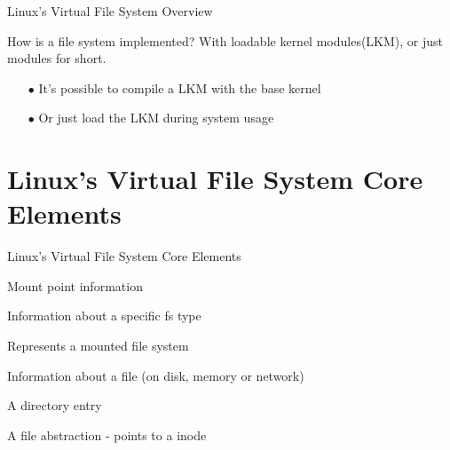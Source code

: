 \documentclass{beamer}
\begin{document}
\begin{frame}{Linux's Virtual File System Overview}

	\begin{block}{How is a file system implemented?}
		With loadable kernel modules\footnotemark[1] (LKM), or just modules for short.
	\end{block}

	\vspace{15pt}

	\begin{itemize}
	
		\item[$\bullet$]{It's possible to compile a LKM with the base kernel}
		\item[$\bullet$]{Or just load the LKM during system usage}

	\end{itemize}


\end{frame}

\section{Linux's Virtual File System Core Elements}

\begin{frame}{Linux's Virtual File System Core Elements}

	\begin{description}\itemsep4pt
			
		\item[vfsmount]{Mount point information}
		\item[file\_system\_type]{Information about a specific fs type}
		\item[super\_block]{Represents a mounted file system}
		\item[inode]{Information about a file (on disk, memory or network)}
		\item[dentry]{A directory entry}
		\item[file]{A file abstraction - points to a inode}

	\end{description}

\end{frame}
\end{document}
